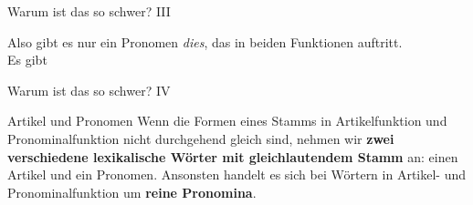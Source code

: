 \begin{frame}
  {Warum ist das so schwer? III}
  \pause
    \begin{center}
    \end{center}
    \Halbzeile
    \pause
    Also gibt es nur \alert{ein Pronomen \textit{dies}}, das \alert{in beiden Funktionen} auftritt.\\
    \pause
   Es gibt 
\end{frame}


\begin{frame}
  {Warum ist das so schwer? IV}
  \pause
  \Zeile
  \begin{block}{Artikel und Pronomen}
    Wenn die Formen eines Stamms in Artikelfunktion und Pronominalfunktion nicht durchgehend gleich sind, nehmen wir \textbf{zwei verschiedene lexikalische Wörter mit gleichlautendem Stamm} an: einen Artikel und ein Pronomen.
    Ansonsten handelt es sich bei Wörtern in Artikel- und Pronominalfunktion um \textbf{reine Pronomina}.
  \end{block}
\end{frame}

